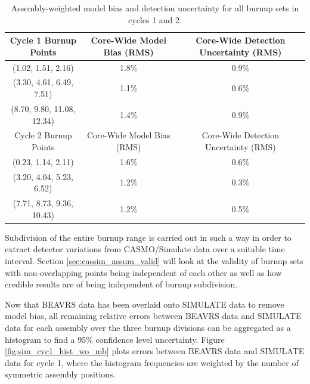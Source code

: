 \documentclass{article}
\begin{document}
\begin{table}[!htb]
  \centering
  \begin{tabular}{CCC}\toprule
     Cycle 1 Burnup Points & Core-Wide \newline Model Bias (RMS) & Core-Wide Detection Uncertainty (RMS) \\ \midrule
     (1.02, 1.51, 2.16) & 1.8\% & 0.9\% \\
     (3.30, 4.61, 6.49, 7.51) & 1.1\% & 0.6\% \\
     (8.70, 9.80, 11.08, 12.34) & 1.4\% & 0.9\% \\
     \toprule
     Cycle 2 Burnup Points & Core-Wide \newline Model Bias (RMS) & Core-Wide Detection Uncertainty (RMS) \\ \midrule
     (0.23, 1.14, 2.11) & 1.6\% & 0.6\% \\
     (3.20, 4.04, 5.23, 6.52) & 1.2\% & 0.3\% \\
     (7.71, 8.73, 9.36, 10.43) & 1.2\% & 0.5\% \\ \bottomrule
  \end{tabular}
  \caption{Assembly-weighted model bias and detection uncertainty for all burnup sets in cycles 1 and 2.}
  \label{table:cyc_mb_tu}
\end{table}

Subdivision of the entire burnup range is carried out in such a way in order to extract detector variations from CASMO/Simulate data over a suitable time interval. Section \ref{sec:cassim_assum_valid} will look at the validity of burnup sets with non-overlapping points being independent of each other as well as how credible results are of being independent of burnup subdivision.

Now that BEAVRS data has been overlaid onto SIMULATE data to remove model bias, all remaining relative errors between BEAVRS data and SIMULATE data for each assembly over the three burnup divisions can be aggregated as a histogram to find a 95\% confidence level uncertainty.  Figure \ref{fig:sim_cyc1_hist_wo_mb} plots errors between BEAVRS data and SIMULATE data for cycle 1, where the histogram frequencies are weighted by the number of symmetric assembly positions. 
\end{document}
